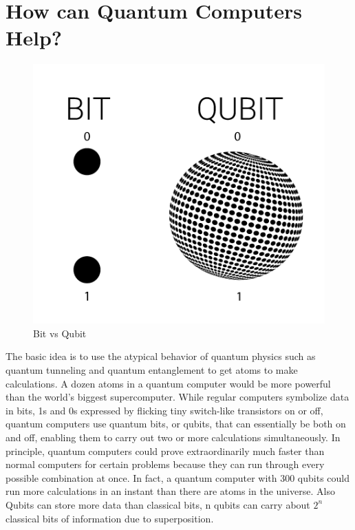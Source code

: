 \section{How can Quantum Computers Help?}
\begin{figure}[H]
\centering\includegraphics[width=.3\textwidth]{images/qubit.png}
\caption{Bit vs Qubit}
\end{figure}
The basic idea is to use the atypical behavior of quantum physics such as quantum tunneling and quantum entanglement to get atoms to make calculations. A dozen atoms in a quantum computer would be more powerful than the world’s biggest supercomputer. While regular computers symbolize data in bits, 1s and 0s expressed by flicking tiny switch-like transistors on or off, quantum computers use quantum bits, or qubits, that can essentially be both on and off, enabling them to carry out two or more calculations simultaneously. In principle, quantum computers could prove extraordinarily much faster than normal computers for certain problems because they can run through every possible combination at once. In fact, a quantum computer with 300 qubits could run more calculations in an instant than there are atoms in the universe. Also Qubits can store more data than classical bits, n qubits can carry about $2^n$ classical bits of information due to superposition.
